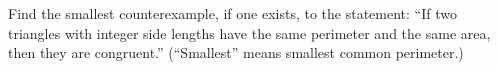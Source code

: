 Find the smallest counterexample, if one exists, to the statement: ``If two triangles with integer side lengths have the same perimeter and the same area, then they are congruent.'' (``Smallest'' means smallest common perimeter.)
